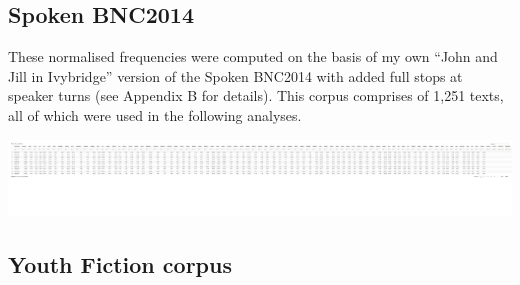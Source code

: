 \documentclass[
  letterpaper,
  DIV=11,
  numbers=noendperiod]{scrreprt}
\newenvironment{Shaded}{\begin{snugshade}}{\end{snugshade}}
\newcommand{\AttributeTok}[1]{\textcolor[rgb]{0.40,0.45,0.13}{#1}}
\newcommand{\ConstantTok}[1]{\textcolor[rgb]{0.56,0.35,0.01}{#1}}
\newcommand{\FunctionTok}[1]{\textcolor[rgb]{0.28,0.35,0.67}{#1}}
\newcommand{\NormalTok}[1]{\textcolor[rgb]{0.00,0.23,0.31}{#1}}
\newcommand{\OtherTok}[1]{\textcolor[rgb]{0.00,0.23,0.31}{#1}}
\newcommand{\SpecialCharTok}[1]{\textcolor[rgb]{0.37,0.37,0.37}{#1}}
\newcommand{\StringTok}[1]{\textcolor[rgb]{0.13,0.47,0.30}{#1}}
\begin{document}
\subsection{Spoken BNC2014}\label{spoken-bnc2014-1}

\begin{Shaded}
\end{Shaded}

These normalised frequencies were computed on the basis of my own ``John
and Jill in Ivybridge'' version of the Spoken BNC2014 with added full
stops at speaker turns (see Appendix B for details). This corpus
comprises of 1,251 texts, all of which were used in the following
analyses.

\includegraphics{AppendixG_files/figure-pdf/unnamed-chunk-2-1.pdf}

\subsection{Youth Fiction corpus}\label{youth-fiction-corpus-1}
\end{document}
